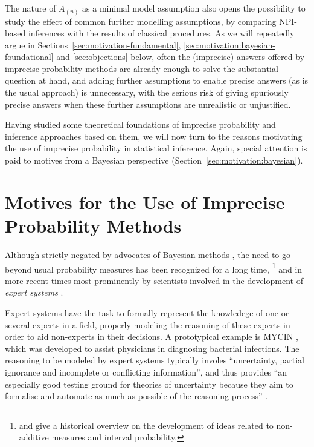 The nature of $A_{(n)}$ as a minimal model assumption also
opens the possibility to study the effect of common further modelling assumptions,
by comparing NPI-based inferences with the results of classical procedures. %
As we will repeatedly argue in Sections~\ref{sec:motivation-fundamental},
\ref{sec:motivation:bayesian-foundational} and \ref{sec:objections} below,
often the (imprecise) answers offered by imprecise probability methods are already enough %
to solve the substantial question at hand,
and adding further assumptions to enable precise answers (as is the usual approach) is unnecessary,
with the serious risk of giving spuriously precise answers
when these further assumptions are unrealistic or unjustified.

\medskip

Having studied some theoretical foundations of imprecise probability 
and inference approaches based on them,
we will now turn to the reasons motivating the use of imprecise probability in statistical inference.
Again, special attention is paid to motives from a Bayesian perspective
(Section~\ref{sec:motivation:bayesian}).

\newpage

\section{Motives for the Use of Imprecise Probability Methods}
\label{sec:motivation}

Although strictly negated by advocates of Bayesian methods \parencite[e.g., by][]{1987:lindley},
the need to go beyond usual probability measures has been recognized for a long time,%
\footnote{\textcite{2009:hampel} and \textcite[\S 1]{2001:weichselberger} give a historical overview on the development of
ideas related to non-additive measures and interval probability.}
and in more recent times most prominently by scientists involved in the development of \emph{expert systems}
\parencite[see, e.g.,][]{1996:walley::expert}.%

Expert systems have the task to formally represent the knowledege of one or several experts in a field,
properly modeling the reasoning of these experts in order to aid non-experts in their decisions.
A prototypical example is MYCIN \parencite{1976:shortliffe},
which was developed to assist physicians in diagnosing bacterial infections.
The reasoning to be modeled by expert systems typically involes
``uncertainty, partial ignorance and incomplete or conflicting information'', and thus provides
``an especially good testing ground for theories of uncertainty
because they aim to formalise and automate as much as possible
of the reasoning process'' \parencite[p.~2]{1996:walley::expert}.

